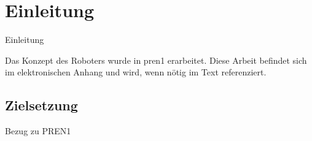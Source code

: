 \section{Einleitung}

Einleitung


Das Konzept des Roboters wurde in \acrfull{pren1} erarbeitet. Diese Arbeit befindet sich im elektronischen Anhang und wird, wenn nötig im Text referenziert.

\subsection{Zielsetzung}

Bezug zu PREN1